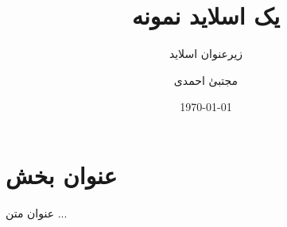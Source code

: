 \documentclass{beamer}
\title{یک اسلاید نمونه}
\subtitle{زیرعنوان اسلاید}
\author{مجتبیٰ احمدی}
\date{\today}
\begin{document}
\begin{frame}
\maketitle
\end{frame}
\section{عنوان بخش}
\begin{frame}
\begin{block}{عنوان}
متن ...
\end{block}
\end{frame}
\end{document}
